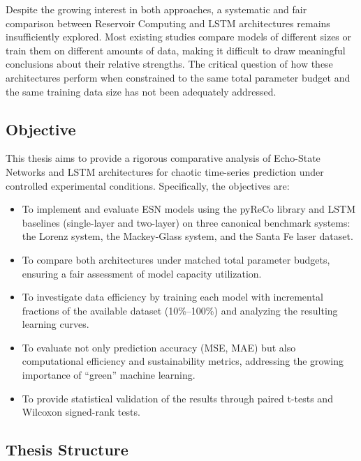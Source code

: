Despite the growing interest in both approaches, a systematic and fair comparison between Reservoir Computing and LSTM architectures remains insufficiently explored. Most existing studies compare models of different sizes or train them on different amounts of data, making it difficult to draw meaningful conclusions about their relative strengths. The critical question of how these architectures perform when constrained to the same total parameter budget and the same training data size has not been adequately addressed.

\subsection{Objective}

This thesis aims to provide a rigorous comparative analysis of Echo-State Networks and LSTM architectures for chaotic time-series prediction under controlled experimental conditions. Specifically, the objectives are:

\begin{itemize}
    \item To implement and evaluate ESN models using the pyReCo library and LSTM baselines (single-layer and two-layer) on three canonical benchmark systems: the Lorenz system, the Mackey-Glass system, and the Santa Fe laser dataset.
    \item To compare both architectures under matched total parameter budgets, ensuring a fair assessment of model capacity utilization.
    \item To investigate data efficiency by training each model with incremental fractions of the available dataset (10\%--100\%) and analyzing the resulting learning curves.
    \item To evaluate not only prediction accuracy (MSE, MAE) but also computational efficiency and sustainability metrics, addressing the growing importance of ``green'' machine learning.
    \item To provide statistical validation of the results through paired t-tests and Wilcoxon signed-rank tests.
\end{itemize}

\subsection{Thesis Structure}

